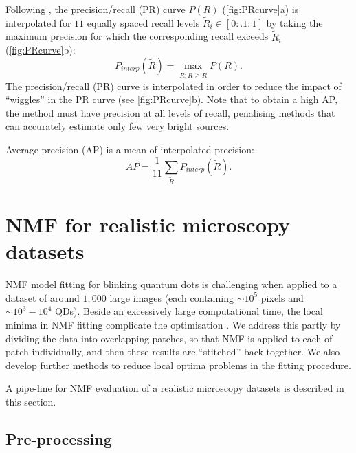 Following \cite{Everingham2009}, the precision/recall (PR) curve $P(R)$ (\autoref{fig:PRcurve}a) is interpolated for $11$ equally spaced recall levels $\tilde{R}_{i}\in[0:.1:1]$ by taking the maximum precision for which the corresponding recall exceeds $\tilde{R}_{i}$ (\autoref{fig:PRcurve}b):
%
\begin{equation}
	P_{interp}(\tilde{R})=\max_{R;R\geq \tilde{R}}P(R).
\end{equation}
%
The precision/recall (PR) curve is interpolated in order to reduce the impact of ``wiggles'' in the PR curve (see \autoref{fig:PRcurve}b). Note that to obtain a high AP, the method must have precision at all levels of recall, penalising methods that can accurately estimate only few very bright sources. 

Average precision (AP) is a mean of interpolated precision:
%
\begin{equation}
	AP=\frac{1}{11}\sum_{\tilde{R}}{P_{interp}(\tilde{R})}.
	\label{eq:AP}
\end{equation}


\clearpage
\section{NMF for realistic microscopy datasets \label{sec:NMF-for-real}}

NMF model fitting for blinking quantum dots is challenging when applied to a dataset of around $1,000$ large images (each containing $\sim 10^{5}$ pixels and $\sim10^{3}-10^{4}$ QDs). Beside an excessively large computational time, the local minima in NMF fitting complicate the optimisation \cite{Kim2008}. We address this partly by dividing the data into overlapping patches, so that NMF is applied to each of patch individually, and then these results are ``stitched'' back together. We also develop further methods to reduce local optima problems in the fitting procedure. 

A pipe-line for NMF evaluation of a realistic microscopy datasets is described in this section.



\subsection{Pre-processing \label{sec:preproc}}

